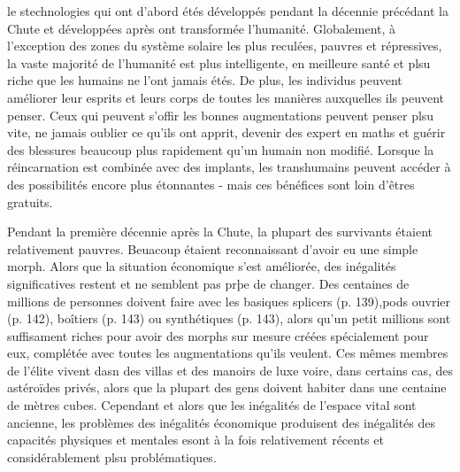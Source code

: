 le stechnologies qui ont d'abord étés développés pendant la décennie précédant la Chute et développées après ont transformée l'humanité. Globalement, à l'exception des zones du système solaire les plus reculées, pauvres et répressives, la vaste majorité de l'humanité est plus intelligente, en meilleure santé et plsu riche que les humains ne l'ont jamais étés. De plus, les individus peuvent améliorer leur esprits et leurs corps de toutes les manières auxquelles ils peuvent penser. Ceux qui peuvent s'offir les bonnes augmentations peuvent penser plsu vite, ne jamais oublier ce qu'ils ont apprit, devenir des expert en maths et guérir des blessures beaucoup plus rapidement qu'un humain non modifié. Lorsque la réincarnation est combinée avec des implants, les transhumains peuvent accéder à des possibilités encore plus étonnantes - mais ces bénéfices sont loin d'êtres gratuits. 

Pendant la première décennie après la Chute, la plupart des survivants étaient relativement pauvres. Beuacoup étaient reconnaissant d'avoir eu une simple morph. Alors que la situation économique s'est améliorée, des inégalités significatives restent et ne semblent pas prþe de changer. Des centaines de millions de personnes doivent faire avec les basiques splicers (p. 139),pods ouvrier (p. 142), boîtiers (p. 143) ou synthétiques (p. 143), alors qu'un petit millions sont suffisament riches pour avoir des morphs sur mesure créées spécialement pour eux, complétée avec toutes les augmentations qu'ils veulent. Ces mêmes membres de l'élite vivent dasn des villas et des manoirs de luxe voire, dans certains cas, des astéroïdes privés, alors que la plupart des gens doivent habiter dans une centaine de mètres cubes. Cependant et alors que les inégalités de l'espace vital sont ancienne, les problèmes des inégalités économique produisent des inégalités des capacités physiques et mentales esont à la fois relativement récents et considérablement plsu problématiques. 

